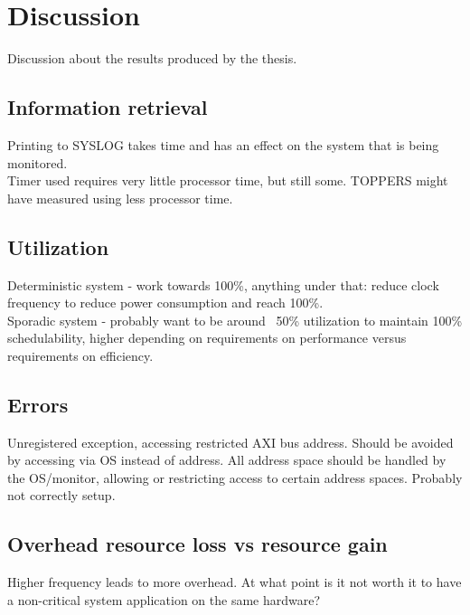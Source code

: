 \chapter{Discussion}
Discussion about the results produced by the thesis.

\section{Information retrieval}
Printing to SYSLOG takes time and has an effect on the system that is being monitored.\\

Timer used requires very little processor time, but still some. TOPPERS might have measured using less processor time.

\section{Utilization}
Deterministic system - work towards 100\%, anything under that: reduce clock frequency to reduce power consumption and reach 100\%.\\

Sporadic system - probably want to be around ~50\% utilization to maintain 100\% schedulability, higher depending on requirements on performance versus requirements on efficiency.

\section{Errors}
Unregistered exception, accessing restricted AXI bus address. Should be avoided by accessing via OS instead of address. All address space should be handled by the OS/monitor, allowing or restricting access to certain address spaces. Probably not correctly setup.

\section{Overhead resource loss vs resource gain}
Higher frequency leads to more overhead. At what point is it not worth it to have a non-critical system application on the same hardware?